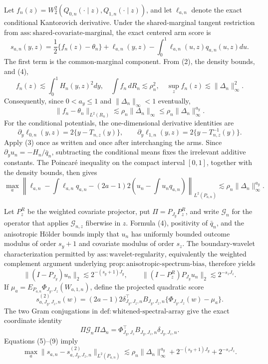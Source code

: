 Let \(f_n(z)=W_2^2(Q_{0,n}(\cdot\mid z),Q_{1,n}(\cdot\mid z))\), and let \(\ell_{a,n}\) denote the exact conditional Kantorovich derivative. Under the shared-marginal tangent restriction from \(\mathrm{ass{:}shared\text{-}covariate\text{-}marginal}\), the exact centered arm score is
\[
s_{a,n}(y,z)
=\frac12\{f_n(z)-\theta_n\}
+\ell_{a,n}(y,z)-\int_0^1\ell_{a,n}(u,z)q_{a,n}(u,z)du. \tag{5}
\]
The first term is the common-marginal component. From (2), the density bounds, and (4),
\[
f_n(z)\lesssim\int_0^1H_n(y,z)^2dy,
\quad
\int f_n\,dR_n\lesssim\rho_n^2,
\quad
\sup_z f_n(z)\lesssim\|\Delta_n\|_\infty^2.
\]
Consequently, since \(0<a_y\le1\) and \(\|\Delta_n\|_\infty<1\) eventually,
\[
\|f_n-\theta_n\|_{L^2(R_n)}
\lesssim\rho_n\|\Delta_n\|_\infty
\le\rho_n\|\Delta_n\|_\infty^{a_y}. \tag{6}
\]
For the conditional potentials, the one-dimensional derivative identities are
\[
\partial_y\ell_{0,n}(y,z)=2\{y-T_{n,z}(y)\},
\qquad
\partial_y\ell_{1,n}(y,z)=2\{y-T_{n,z}^{-1}(y)\}.
\]
Apply (3) once as written and once after interchanging the arms. Since \(\partial_yu_n=-H_n/\bar q_n\), subtracting the conditional means fixes the irrelevant additive constants. The Poincar\'e inequality on the compact interval \([0,1]\), together with the density bounds, then gives
\[
\max_a\left\|
\ell_{a,n}-\int\ell_{a,n}q_{a,n}
-(2a-1)2\left(u_n-\int u_nq_{a,n}\right)
\right\|_{L^2(P_{a,n})}
\lesssim\rho_n\|\Delta_n\|_\infty^{a_y}. \tag{7}
\]

Let \(P_z^R\) be the weighted covariate projector, put \(\Pi=P_{J_y}P_z^R\), and write \(\mathcal G_n\) for the operator that applies \(\mathcal G_{n,z}\) fiberwise in \(z\). Formula (4), positivity of \(\bar q_n\), and the anisotropic H\"older bounds imply that \(u_n\) has uniformly bounded outcome modulus of order \(s_y+1\) and covariate modulus of order \(s_z\). The boundary-wavelet characterization permitted by \(\mathrm{ass{:}wavelet\text{-}regularity}\), equivalently the weighted complement argument underlying \(\mathrm{prop{:}anisotropic\text{-}spectrum\text{-}bias}\), therefore yields
\[
\|(I-P_{J_y})u_n\|_2\lesssim2^{-(s_y+1)J_y},
\qquad
\|(I-P_z^R)P_{J_y}u_n\|_2\lesssim2^{-s_zJ_z}. \tag{8}
\]
If \(\mu_a=E_{P_{a,n}}\Phi_{J_y,J_z}(W_{a,1,n})\), define the projected quadratic score
\[
s^{(2)}_{a,J_y,J_z,n}(w)
=(2a-1)2\delta_{J_y,J_z,n}^{\top}B_{J_y,J_z,n}
\{\Phi_{J_y,J_z}(w)-\mu_a\}.
\]
The two Gram conjugations in \(\mathrm{def{:}whitened\text{-}spectral\text{-}array}\) give the exact coordinate identity
\[
\Pi\mathcal G_n\Pi\Delta_n
=\Phi_{J_y,J_z}^{\top}B_{J_y,J_z,n}\delta_{J_y,J_z,n}. \tag{9}
\]
Equations (5)--(9) imply
\[
\max_a\|s_{a,n}-s^{(2)}_{a,J_y,J_z,n}\|_{L^2(P_{a,n})}
\lesssim
\rho_n\|\Delta_n\|_\infty^{a_y}
+2^{-(s_y+1)J_y}+2^{-s_zJ_z}. \tag{10}
\]

